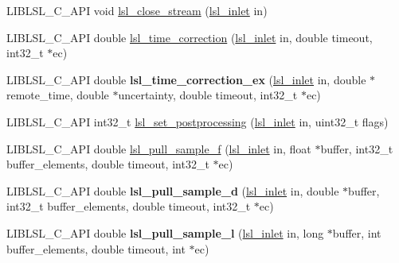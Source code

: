 \begin{DoxyCompactItemize}
\item 
L\+I\+B\+L\+S\+L\+\_\+\+C\+\_\+\+A\+PI void \hyperlink{namespacelsl_a3adefb15364dacbfa8f46b5f554ed4ac}{lsl\+\_\+close\+\_\+stream} (\hyperlink{namespacelsl_a884a3363cfcba75d7ce8f00c1c4c54f1}{lsl\+\_\+inlet} in)
\item 
L\+I\+B\+L\+S\+L\+\_\+\+C\+\_\+\+A\+PI double \hyperlink{namespacelsl_a4a017b7c6d6fbe056b5394b1edff0994}{lsl\+\_\+time\+\_\+correction} (\hyperlink{namespacelsl_a884a3363cfcba75d7ce8f00c1c4c54f1}{lsl\+\_\+inlet} in, double timeout, int32\+\_\+t $\ast$ec)
\item 
\mbox{\label{namespacelsl_aaa10a13a7b2aced436ba8a14c21af2bb}} 
L\+I\+B\+L\+S\+L\+\_\+\+C\+\_\+\+A\+PI double {\bfseries lsl\+\_\+time\+\_\+correction\+\_\+ex} (\hyperlink{namespacelsl_a884a3363cfcba75d7ce8f00c1c4c54f1}{lsl\+\_\+inlet} in, double $\ast$remote\+\_\+time, double $\ast$uncertainty, double timeout, int32\+\_\+t $\ast$ec)
\item 
L\+I\+B\+L\+S\+L\+\_\+\+C\+\_\+\+A\+PI int32\+\_\+t \hyperlink{namespacelsl_a36fe6c26cb8c696b658c87490d4c1059}{lsl\+\_\+set\+\_\+postprocessing} (\hyperlink{namespacelsl_a884a3363cfcba75d7ce8f00c1c4c54f1}{lsl\+\_\+inlet} in, uint32\+\_\+t flags)
\item 
L\+I\+B\+L\+S\+L\+\_\+\+C\+\_\+\+A\+PI double \hyperlink{namespacelsl_a56fc49301c94b76f1c89ab041d26bef1}{lsl\+\_\+pull\+\_\+sample\+\_\+f} (\hyperlink{namespacelsl_a884a3363cfcba75d7ce8f00c1c4c54f1}{lsl\+\_\+inlet} in, float $\ast$buffer, int32\+\_\+t buffer\+\_\+elements, double timeout, int32\+\_\+t $\ast$ec)
\item 
\mbox{\label{namespacelsl_a958abfca3463aaf5703230b472e8e988}} 
L\+I\+B\+L\+S\+L\+\_\+\+C\+\_\+\+A\+PI double {\bfseries lsl\+\_\+pull\+\_\+sample\+\_\+d} (\hyperlink{namespacelsl_a884a3363cfcba75d7ce8f00c1c4c54f1}{lsl\+\_\+inlet} in, double $\ast$buffer, int32\+\_\+t buffer\+\_\+elements, double timeout, int32\+\_\+t $\ast$ec)
\item 
\mbox{\label{namespacelsl_a7572c63f7c2569ddffb3ac2d8c16bd1e}} 
L\+I\+B\+L\+S\+L\+\_\+\+C\+\_\+\+A\+PI double {\bfseries lsl\+\_\+pull\+\_\+sample\+\_\+l} (\hyperlink{namespacelsl_a884a3363cfcba75d7ce8f00c1c4c54f1}{lsl\+\_\+inlet} in, long $\ast$buffer, int buffer\+\_\+elements, double timeout, int $\ast$ec)
\item 
\mbox{\label{namespacelsl_a201e5c7d48e0b815c30bb155f116eb42}} 

\end{DoxyCompactItemize}
